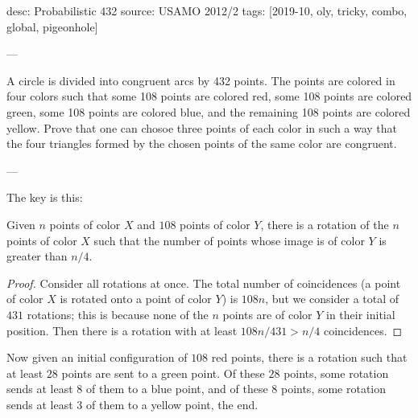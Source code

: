 desc: Probabilistic 432
source: USAMO 2012/2
tags: [2019-10, oly, tricky, combo, global, pigeonhole]

---

A circle is divided into congruent arcs by 432 points. The points are colored in four colors such that some 108 points are colored red, some 108 points are colored green, some 108 points are colored blue, and the remaining 108 points are colored yellow. Prove that one can chosoe three points of each color in such a way that the four triangles formed by the chosen points of the same color are congruent.

---

The key is this:
\begin{iclaim*}
    Given $n$ points of color $X$ and $108$ points of color $Y$, there is a rotation of the $n$ points of color $X$ such that the number of points whose image is of color $Y$ is greater than $n/4$.
\end{iclaim*}
\begin{proof}
    Consider all rotations at once. The total number of coincidences (a point of color $X$ is rotated onto a point of color $Y$) is $108n$, but we consider a total of $431$ rotations; this is because none of the $n$ points are of color $Y$ in their initial position. Then there is a rotation with at least $108n/431>n/4$ coincidences.
\end{proof}

Now given an initial configuration of $108$ red points, there is a rotation such that at least $28$ points are sent to a green point. Of these $28$ points, some rotation sends at least $8$ of them to a blue point, and of these $8$ points, some rotation sends at least $3$ of them to a yellow point, the end.
